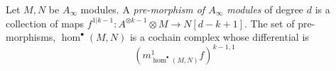   
Let $M, N$ be $A_\infty$ modules. A  \emph{pre-morphism of $A_\infty$ modules} of degree $d$ is a collection of maps $f^{1|k-1}: A^{\otimes k-1}\otimes M\to N[d-k+1]$. The set of pre-morphisms, $\hom^\bullet(M, N)$ is a cochain complex whose differential is
\[(m^1_{\hom^\bullet(M, N)} f)^{k-1, 1}\]

 